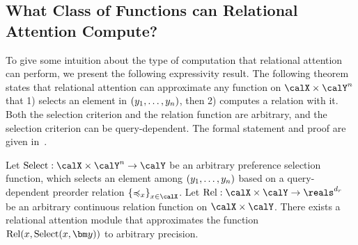 
\subsection{What Class of Functions can Relational Attention Compute?}\label{ssec:approx}
To give some intuition about the type of computation that relational attention can perform, we present the following expressivity result. The following theorem states that relational attention can approximate any function on $\calX \times \calY^n$ that 1) selects an element in $(y_1, \ldots, y_n)$, then 2) computes a relation with it. Both the selection criterion and the relation function are arbitrary, and the selection criterion can be query-dependent. The formal statement and proof are given in~.
\begin{theorem}[Informal]\label{theorem:func_class}
  Let $\mathrm{Select}: \calX \times \calY^n \to \calY$ be an arbitrary preference selection function, which selects an element among $(y_1, \ldots, y_n)$ based on a query-dependent preorder relation ${\{\preceq_x\}}_{x \in \calX}$. Let $\mathrm{Rel}: \calX \times \calY \to \reals^{d_r}$ be an arbitrary continuous relation function on $\calX \times \calY$. There exists a relational attention module that approximates the function $\mathrm{Rel}(x, \mathrm{Select}(x, \y))$ to arbitrary precision.
\end{theorem}
